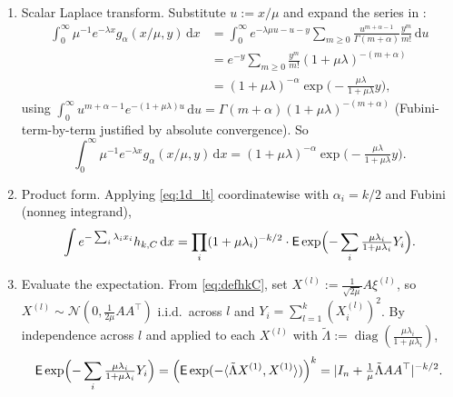 \documentclass[12pt,a4paper]{article}
\makeatletter
\theoremstyle{definition}
\renewenvironment{proof}[1][\proofname]{\par
  \pushQED{\qed}%
  \normalfont \topsep6\p@\@plus6\p@\relax
  \trivlist
  \item[\hskip\labelsep\bfseries #1\@addpunct{.}]\ignorespaces
}{%
  \popQED\endtrivlist\@endpefalse
}
\newcommand{\EE}{\mathsf{E}}
\newcommand{\diag}{\operatorname{diag}}
\newcommand{\dd}{\mathrm{d}}
\newcommand{\caln}{\mathcal{N}}
\makeatother
\begin{document}
\begin{proof}
  \leavevmode
  \begin{enumerate}
    \item Scalar Laplace transform.  Substitute $u:=x/\mu$ and expand
      the series in :
      \begin{align*}
        \int_0^\infty\mu^{-1}e^{-\lambda x}g_\alpha(x/\mu,y)\,\dd x
        &=\int_0^\infty e^{-\lambda\mu u-u-y}
          \sum_{m\geqslant 0}\tfrac{u^{m+\alpha-1}}{\Gamma(m+\alpha)}
          \tfrac{y^m}{m!}\,\dd u\\
        &=e^{-y}\sum_{m\geqslant 0}\tfrac{y^m}{m!}(1+\mu\lambda)^{-(m+\alpha)}\\
        &=(1+\mu\lambda)^{-\alpha}\exp\bigl(-\tfrac{\mu\lambda}{1+\mu\lambda}y\bigr),
      \end{align*}
      using $\int_0^\infty u^{m+\alpha-1}e^{-(1+\mu\lambda)u}\,\dd u
      =\Gamma(m+\alpha)(1+\mu\lambda)^{-(m+\alpha)}$ (Fubini-term-by-term
      justified by absolute convergence).  So
      \begin{equation}\label{eq:1d_lt}
        \int_0^\infty\mu^{-1}e^{-\lambda x}g_\alpha(x/\mu,y)\,\dd x
        =(1+\mu\lambda)^{-\alpha}\exp\bigl(-\tfrac{\mu\lambda}{1+\mu\lambda}y\bigr).
      \end{equation}

    \item Product form.  Applying \eqref{eq:1d_lt} coordinatewise with
      $\alpha_i=k/2$ and Fubini (nonneg integrand),
      \begin{equation}\label{eq:hkC_step1}
        \int e^{-\sum_i\lambda_ix_i}h_{k,C}\,\dd x
        =\prod_i(1+\mu\lambda_i)^{-k/2}\cdot
        \EE\exp\Bigl(-\sum_i\tfrac{\mu\lambda_i}{1+\mu\lambda_i}Y_i\Bigr).
      \end{equation}

    \item Evaluate the expectation.  From \eqref{eq:defhkC}, set
      $X^{(l)}:=\tfrac{1}{\sqrt{2\mu}}A\xi^{(l)}$, so
      $X^{(l)}\sim\caln(0,\tfrac{1}{2\mu}AA^\top)$ i.i.d.\ across $l$
      and $Y_i=\sum_{l=1}^k(X_i^{(l)})^2$.  By independence across $l$
      and  applied to each $X^{(l)}$ with
      $\tilde\Lambda:=\diag(\tfrac{\mu\lambda_i}{1+\mu\lambda_i})$,
      \[
        \EE\exp\Bigl(-\sum_i\tfrac{\mu\lambda_i}{1+\mu\lambda_i}Y_i\Bigr)
        =\Bigl(\EE\exp(-\langle\tilde\Lambda X^{(1)},X^{(1)}\rangle)\Bigr)^k
        =|I_n+\tfrac{1}{\mu}\tilde\Lambda AA^\top|^{-k/2}.
      \]


\end{enumerate}
\end{proof}
\end{document}
